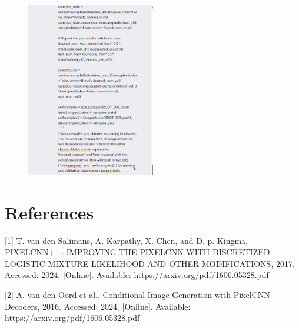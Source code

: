 \documentclass{article}
\begin{document}
\begin{figure}[H]
    \centering
    \includegraphics[width=0.5\textwidth]{report_data/g-19.png}
\end{figure}



\section*{References}
[1] T. van den Salimans, A. Karpathy, X. Chen, and D. p. Kingma, PIXELCNN++: IMPROVING THE PIXELCNN WITH DISCRETIZED LOGISTIC MIXTURE LIKELIHOOD AND OTHER MODIFICATIONS, 2017. Accessed: 2024. [Online]. Available: https://arxiv.org/pdf/1606.05328.pdf

[2] A. van den Oord et al., Conditional Image Generation with PixelCNN Decoders, 2016. Accessed: 2024. [Online]. Available: https://arxiv.org/pdf/1606.05328.pdf
\end{document}
